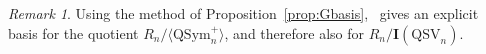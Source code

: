 \documentclass[12pt]{amsart}
\theoremstyle{definition}
\newtheorem{definition}[equation]{Definition}
\theoremstyle{remark}
\newtheorem{rem}[equation]{Remark}
\numberwithin{equation}{section}
\newcommand{\QSym}{\mathrm{QSym}}
\newcommand{\QSV}{\mathrm{QSV}}
\begin{document}
\begin{rem}
Using the method of Proposition~\ref{prop:Gbasis},~\cite[Theorem 4.1]{ABB} gives an explicit basis for the quotient $R_{n}/\langle \QSym_{n}^{+}\rangle$, and therefore also for $R_{n}/\mathbf{I}(\QSV_{n})$.
\end{rem}



%
%
%
%
%
%
% 
% 
% 
% 
\end{document}
